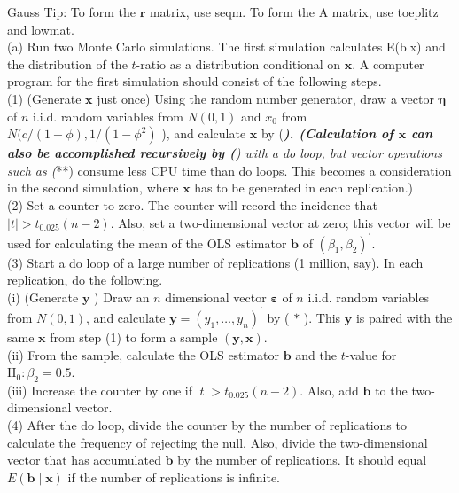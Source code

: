 \documentclass[10pt]{article}
\begin{document}
Gauss Tip: To form the $\mathbf{r}$ matrix, use seqm. To form the A matrix, use toeplitz and lowmat.\\
(a) Run two Monte Carlo simulations. The first simulation calculates E(b|x) and the distribution of the $t$-ratio as a distribution conditional on $\mathbf{x}$. A computer program for the first simulation should consist of the following steps.\\
(1) (Generate $\mathbf{x}$ just once) Using the random number generator, draw a vector $\boldsymbol{\eta}$ of $n$ i.i.d. random variables from $N(0,1)$ and $x_{0}$ from $N(c /(1-\phi), 1 / \left(1-\phi^{2}\right)$ ), and calculate $\mathbf{x}$ by (\textit{\textbf{). (Calculation of $\mathbf{x}$ can also be accomplished recursively by (}) with a do loop, but vector operations such as (}**) consume less CPU time than do loops. This becomes a consideration in the second simulation, where $\mathbf{x}$ has to be generated in each replication.)\\
(2) Set a counter to zero. The counter will record the incidence that $|t|> t_{0.025}(n-2)$. Also, set a two-dimensional vector at zero; this vector will be used for calculating the mean of the OLS estimator $\mathbf{b}$ of $\left(\beta_{1}, \beta_{2}\right)^{\prime}$.\\
(3) Start a do loop of a large number of replications (1 million, say). In each replication, do the following.\\
(i) (Generate $\mathbf{y}$ ) Draw an $n$ dimensional vector $\boldsymbol{\varepsilon}$ of $n$ i.i.d. random variables from $N(0,1)$, and calculate $\mathbf{y}=\left(y_{1}, \ldots, y_{n}\right)^{\prime}$ by ( $*$ ). This $\mathbf{y}$ is paired with the same $\mathbf{x}$ from step (1) to form a sample $(\mathbf{y}, \mathbf{x})$.\\
(ii) From the sample, calculate the OLS estimator $\mathbf{b}$ and the $t$-value for $\mathrm{H}_{0}: \beta_{2}=0.5$.\\
(iii) Increase the counter by one if $|t|>t_{0.025}(n-2)$. Also, add $\mathbf{b}$ to the two-dimensional vector.\\
(4) After the do loop, divide the counter by the number of replications to calculate the frequency of rejecting the null. Also, divide the two-dimensional vector that has accumulated $\mathbf{b}$ by the number of replications. It should equal $E(\mathbf{b} \mid \mathbf{x})$ if the number of replications is infinite.
\end{document}
